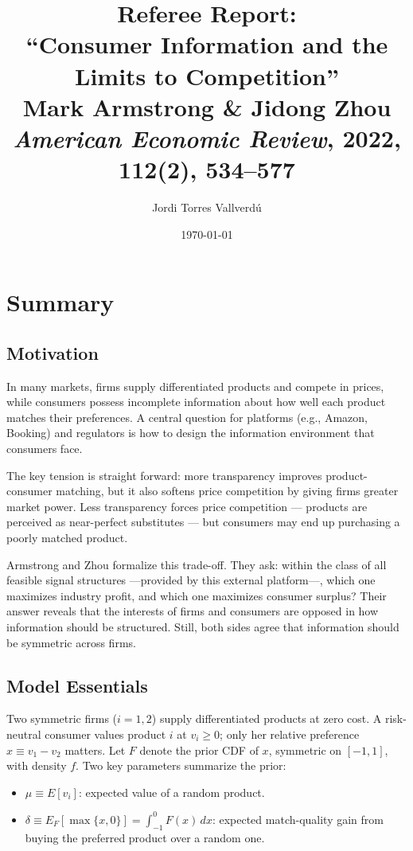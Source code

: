 \documentclass[12pt, a4paper]{article}
\title{\textbf{Referee Report: \\ ``Consumer Information and the Limits to Competition''} \\[6pt]
\large Mark Armstrong \& Jidong Zhou \\
\textit{American Economic Review}, 2022, 112(2), 534--577}
\author{Jordi Torres Vallverd\'{u}}
\date{\today}
\begin{document}
\maketitle
\thispagestyle{empty}

\section{Summary}

\subsection{Motivation}

In many markets, firms supply differentiated products and compete in prices, while consumers possess incomplete information about how well each product matches their preferences. A central question for platforms (e.g., Amazon, Booking) and regulators is how to design the information environment that consumers face.

The key tension is straight forward: more transparency improves product-consumer matching, but it also softens price competition by giving firms greater market power. Less transparency forces price competition --- products are perceived as near-perfect substitutes --- but consumers may end up purchasing a poorly matched product.

Armstrong and Zhou formalize this trade-off. They ask: within the class of all feasible signal structures ---provided by this external platform---, which one maximizes industry profit, and which one maximizes consumer surplus? Their answer reveals that the interests of firms and consumers are opposed in how information should be structured. Still, both sides agree that information should be symmetric across firms.

\subsection{Model Essentials}

Two symmetric firms ($i = 1,2$) supply differentiated products at zero cost. A risk-neutral consumer values product $i$ at $v_i \geq 0$; only her relative preference $x \equiv v_1 - v_2$ matters. Let $F$ denote the prior CDF of $x$, symmetric on $[-1,1]$, with density $f$. Two key parameters summarize the prior:
\begin{itemize}[nosep]
    \item $\mu \equiv E[v_i]$: expected value of a random product.
    \item $\delta \equiv E_F[\max\{x,0\}] = \int_{-1}^{0} F(x)\,dx$: expected match-quality gain from buying the preferred product over a random one.
\end{itemize}
\end{document}
